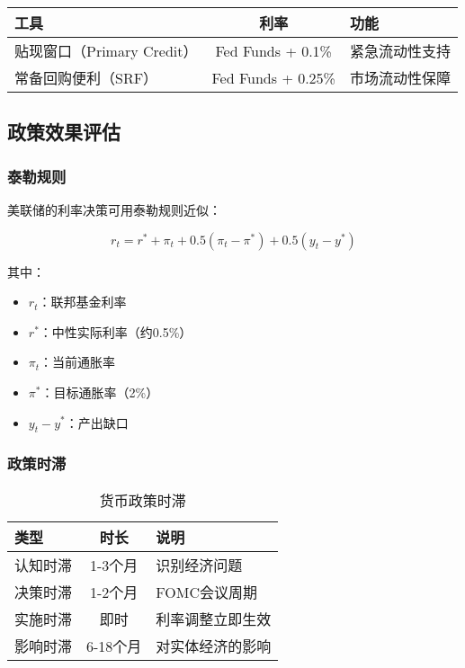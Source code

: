\begin{table}[H]
\centering
\begin{tabular}{|l|c|l|}
\hline
\textbf{工具} & \textbf{利率} & \textbf{功能} \\
\hline
贴现窗口（Primary Credit） & Fed Funds + 0.1\% & 紧急流动性支持 \\
常备回购便利（SRF） & Fed Funds + 0.25\% & 市场流动性保障 \\
\hline
\end{tabular}
\end{table}

\subsection{政策效果评估}

\subsubsection{泰勒规则}

美联储的利率决策可用泰勒规则近似：

\begin{equation}
r_t = r^* + \pi_t + 0.5(\pi_t - \pi^*) + 0.5(y_t - y^*)
\end{equation}

其中：
\begin{itemize}
    \item $r_t$：联邦基金利率
    \item $r^*$：中性实际利率（约0.5\%）
    \item $\pi_t$：当前通胀率
    \item $\pi^*$：目标通胀率（2\%）
    \item $y_t - y^*$：产出缺口
\end{itemize}

\subsubsection{政策时滞}

\begin{table}[h]
\centering
\caption{货币政策时滞}
\begin{tabular}{|l|c|l|}
\hline
\textbf{类型} & \textbf{时长} & \textbf{说明} \\
\hline
认知时滞 & 1-3个月 & 识别经济问题 \\
决策时滞 & 1-2个月 & FOMC会议周期 \\
实施时滞 & 即时 & 利率调整立即生效 \\
影响时滞 & 6-18个月 & 对实体经济的影响 \\
\hline
\end{tabular}
\end{table}

